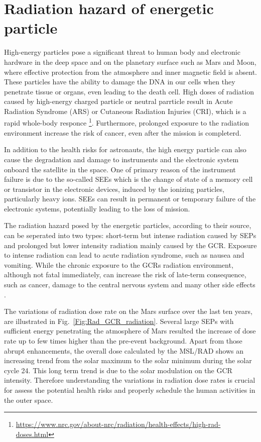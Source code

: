 \section{Radiation hazard of energetic particle}


High-energy particles pose a significant threat to human body and electronic hardware in the deep space and on the planetary surface such as Mars and Moon, where effective protection from the atmosphere and inner magnetic field is absent.
These particles have the ability to damage the \ac{DNA} in our cells when they penetrate tissue or organs, even leading to the death cell.
High doses of radiation caused by high-energy charged particle or  neutral parrticle result in Acute Radiation Syndrome (ARS) or Cutaneous Radiation Injuries (CRI), which is a rapid whole-body responce \footnote{\url{https://www.nrc.gov/about-nrc/radiation/health-effects/high-rad-doses.html}}. Furthermore, prolonged exposure to the radiation environment increase the risk of cancer, even after the mission is completerd.

In addition to the health risks for astronauts, the high energy particle can also cause the degradation and damage to instruments and the electronic system onboard the satellite in the space. One of primary reason of the instrument failure is due to the so-called \acp{SEE} which is the change of state of a memory cell or transistor in the electronic devices, induced by the ionizing particles, particularly heavy ions. \acp{SEE} can result in permanent or temporary failure of the electronic systems, potentially leading to the loss of mission. 



The radiation hazard posed by the energetic particles, according to their source, can be seperated into two types: short-term but intense radiation caused by \acp{SEP} and prolonged but lower intensity radiation mainly caused by the \ac{GCR}.
Exposure to intense radiation can lead to acute radiation syndrome, such as nausea and vomiting. While the chronic exposure to the \acp{GCR} radiation environment, although not fatal immediately, can increase the risk of late-term consequence, such as cancer, damage to the central nervous system and many other side effects \citep{Guo2021AARv_rad, cucinotta2006cancer, Kennedy2014LSSR, Iancu2018Frontiers}. 


The variations of radiation dose rate on the Mars surface over the last ten years, are illustrated in Fig.~\ref{Fig:Rad_GCR_radiation}. Several large \acp{SEP} with sufficient energy penetrating the atmosphere of Mars
resulted the increase of dose rate up to few times higher than the pre-event background. Apart from those abrupt enhancements, the overall dose calculated by the \ac{MSL}/\ac{RAD} shows an increasing trend from the solar maximum to the solar minimum during the solar cycle 24. This long term trend is due to the solar modulation on the \ac{GCR} intensity.
Therefore understanding the variations in radiation dose rates is crucial for assess the potential health risks and properly schedule the human activities in the outer space. 


